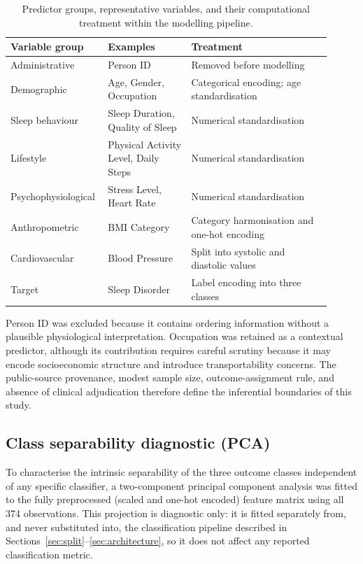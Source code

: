 \documentclass[a4paper,fleqn]{cas-dc}
\begin{document}
\begin{table}[width=\textwidth,pos=!tbp]
\centering
\caption{Predictor groups, representative variables, and their computational treatment within the modelling pipeline.}
\label{tab:variables}
\small
\begin{tabular}{Q{0.24\linewidth}Q{0.25\linewidth}Q{0.42\linewidth}}
\toprule
Variable group & Examples & Treatment \\
\midrule
Administrative & Person ID & Removed before modelling \\
Demographic & Age, Gender, Occupation & Categorical encoding; age standardisation \\
Sleep behaviour & Sleep Duration, Quality of Sleep & Numerical standardisation \\
Lifestyle & Physical Activity Level, Daily Steps & Numerical standardisation \\
Psychophysiological & Stress Level, Heart Rate & Numerical standardisation \\
Anthropometric & BMI Category & Category harmonisation and one-hot encoding \\
Cardiovascular & Blood Pressure & Split into systolic and diastolic values \\
Target & Sleep Disorder & Label encoding into three classes \\
\bottomrule
\end{tabular}
\end{table}

Person ID was excluded because it contains ordering information without a plausible physiological interpretation. Occupation was retained as a contextual predictor, although its contribution requires careful scrutiny because it may encode socioeconomic structure and introduce transportability concerns. The public-source provenance, modest sample size, outcome-assignment rule, and absence of clinical adjudication therefore define the inferential boundaries of this study.

\subsection{Class separability diagnostic (PCA)}
\label{sec:pca}
To characterise the intrinsic separability of the three outcome classes independent of any specific classifier, a two-component principal component analysis was fitted to the fully preprocessed (scaled and one-hot encoded) feature matrix using all 374 observations. This projection is diagnostic only: it is fitted separately from, and never substituted into, the classification pipeline described in Sections~\ref{sec:split}--\ref{sec:architecture}, so it does not affect any reported classification metric.
\end{document}
